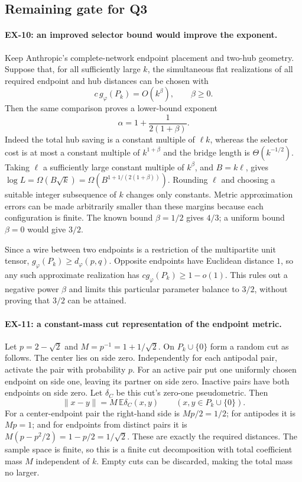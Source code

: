 \subsection{Remaining gate for Q3}
\label{sec:ex-open}

\paragraph{EX-10: an improved selector bound would improve the exponent.}
Keep Anthropic's complete-network endpoint placement and two-hub geometry.
Suppose that, for all sufficiently large $k$, the simultaneous flat
realizations of all required endpoint and hub distances can be chosen with
\[
 c\,g_\varphi(P_k)=O(k^\beta),\qquad\beta\geq0.
\]
Then the same comparison proves a lower-bound exponent
\[
 \alpha=1+\frac{1}{2(1+\beta)}.
\]
Indeed the total hub saving is a constant multiple of $\ell k$, whereas the
selector cost is at most a constant multiple of $k^{1+\beta}$ and the bridge
length is $\Theta(k^{-1/2})$.  Taking $\ell$ a sufficiently large constant
multiple of $k^\beta$, and $B=k\ell$, gives
$\log L=\Omega(B\sqrt k)=\Omega(B^{1+1/(2(1+\beta))})$.
Rounding $\ell$ and choosing a suitable integer subsequence of $k$ changes
only constants.  Metric approximation errors can be made arbitrarily smaller
than these margins because each configuration is finite.  The known bound
$\beta=1/2$ gives $4/3$; a uniform bound $\beta=0$ would give $3/2$.

Since a wire between two endpoints is a restriction of the multipartite unit
tensor, $g_\varphi(P_k)\geq d_\varphi(p,q)$.  Opposite endpoints have Euclidean
distance $1$, so any such approximate realization has
$c g_\varphi(P_k)\geq1-o(1)$.  This rules out a negative power $\beta$ and limits
this particular parameter balance to $3/2$, without proving that $3/2$ can be
attained.

\paragraph{EX-11: a constant-mass cut representation of the endpoint metric.}
Let $p=2-\sqrt2$ and $M=p^{-1}=1+1/\sqrt2$.  On
$P_k\cup\{0\}$ form a random cut as follows.  The center lies on side zero.
Independently for each antipodal pair, activate the pair with probability $p$.
For an active pair put one uniformly chosen endpoint on side one, leaving its
partner on side zero.  Inactive pairs have both endpoints on side zero.  Let
$\delta_C$ be this cut's zero-one pseudometric.  Then
\[
  \|x-y\|=M\,\mathbb E\delta_C(x,y)
  \qquad(x,y\in P_k\cup\{0\}).
\]
For a center-endpoint pair the right-hand side is $Mp/2=1/2$; for antipodes it
is $Mp=1$; and for endpoints from distinct pairs it is
$M(p-p^2/2)=1-p/2=1/\sqrt2$.  These are exactly the required distances.
The sample space is finite, so this is a finite cut decomposition with total
coefficient mass $M$ independent of $k$.  Empty cuts can be discarded, making
the total mass no larger.

